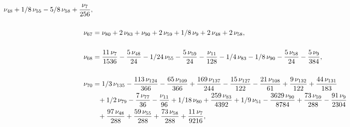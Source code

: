 \documentclass[a4paper,12pt, DIV=14, BCOR=5mm, twoside, headsepline]{scrbook}
\begin{document}
\begin{align}
\begin{aligned}
\nu_{{48}}+1/8\,\nu_{{55}}-5/8\,\nu_{{58}}+{\frac {\nu_{{7}}}{256}},\\
\\
\nu_{{67}}&=\nu_{{80}}+2\,\nu_{{83}}+\nu_{{90}}+2\,\nu_{{59}}+1/8\,\nu_
{{9}}+2\,\nu_{{48}}+2\,\nu_{{58}}, \\
\\
\nu_{{68}}&={\frac {11\,\nu_{{7}}}{
1536}}-{\frac {5\,\nu_{{48}}}{24}}-1/24\,\nu_{{55}}-{\frac {5\,\nu_{{
59}}}{24}}-{\frac {\nu_{{11}}}{128}}-1/4\,\nu_{{83}}-1/8\,\nu_{{90}}-{
\frac {5\,\nu_{{58}}}{24}}-{\frac {5\,\nu_{{9}}}{384}}, \\
\\
\nu_{{70}}&=1/3
\,\nu_{{135}}-{\frac {113\,\nu_{{124}}}{366}}-{\frac {65\,\nu_{{109}}
}{366}}+{\frac {169\,\nu_{{137}}}{244}}-{\frac {15\,\nu_{{127}}}{122}}
-{\frac {21\,\nu_{{108}}}{61}}+{\frac {9\,\nu_{{132}}}{122}}+{\frac {
44\,\nu_{{131}}}{183}}\\
 &\hphantom{=}+1/2\,\nu_{{79}}-{\frac {7\,\nu_{{77}}}{36}}-{
\frac {\nu_{{11}}}{96}}+1/18\,\nu_{{80}}+{\frac {259\,\nu_{{83}}}{4392
}}+1/9\,\nu_{{51}}-{\frac {3629\,\nu_{{90}}}{8784}}+{\frac {73\,\nu_{{
59}}}{288}}-{\frac {91\,\nu_{{9}}}{2304}}\\
 &\hphantom{=}+{\frac {97\,\nu_{{48}}}{288}
}+{\frac {59\,\nu_{{55}}}{288}}+{\frac {73\,\nu_{{58}}}{288}}+{\frac {
11\,\nu_{{7}}}{9216}}, 
\end{aligned}
\end{align}
\end{document}
